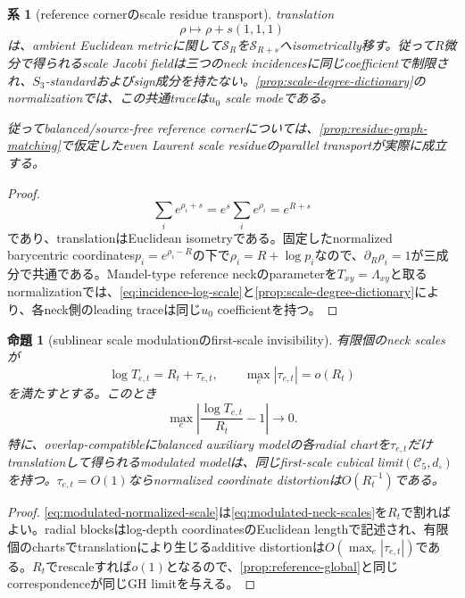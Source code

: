 \documentclass[11pt,a4paper]{ltjsarticle}
\newtheorem{proposition}[theorem]{命題}
\newtheorem{corollary}[theorem]{系}
\theoremstyle{definition}
\theoremstyle{remark}
\begin{document}
\begin{corollary}[reference cornerのscale residue transport]\label{cor:reference-corner-scale-transport}
translation
\begin{equation}\label{eq:softmax-diagonal-translation}
 \rho\longmapsto\rho+s(1,1,1)
\end{equation}
は、ambient Euclidean metricに関して$\mathscr S_R$を$\mathscr S_{R+s}$へisometrically移す。従って$R$微分で得られるscale Jacobi fieldは三つのneck incidencesに同じcoefficientで制限され、$S_3$-standardおよびsign成分を持たない。\cref{prop:scale-degree-dictionary}のnormalizationでは、この共通traceは$u_0$ scale modeである。

従ってbalanced/source-free reference cornerについては、\cref{prop:residue-graph-matching}で仮定したeven Laurent scale residueのparallel transportが実際に成立する。
\end{corollary}

\begin{proof}
\[
 \sum_ie^{\rho_i+s}=e^s\sum_ie^{\rho_i}=e^{R+s}
\]
であり、translationはEuclidean isometryである。固定したnormalized barycentric coordinates$p_i=e^{\rho_i-R}$の下で$\rho_i=R+\log p_i$なので、$\partial_R\rho_i=1$が三成分で共通である。Mandel-type reference neckのparameterを$T_{xy}=\Lambda_{xy}$と取るnormalizationでは、\eqref{eq:incidence-log-scale}と\cref{prop:scale-degree-dictionary}により、各neck側のleading traceは同じ$u_0$ coefficientを持つ。
\end{proof}

\begin{proposition}[sublinear scale modulationのfirst-scale invisibility]\label{prop:scale-modulation-invisible}
有限個のneck scalesが
\begin{equation}\label{eq:modulated-neck-scales}
 \log T_{e,t}=R_t+\tau_{e,t},
 \qquad
 \max_e|\tau_{e,t}|=o(R_t)
\end{equation}
を満たすとする。このとき
\begin{equation}\label{eq:modulated-normalized-scale}
 \max_e\left|\frac{\log T_{e,t}}{R_t}-1\right|\longrightarrow0.
\end{equation}
特に、overlap-compatibleにbalanced auxiliary modelの各radial chartを$\tau_{e,t}$だけtranslationして得られるmodulated modelは、同じfirst-scale cubical limit$(\mathcal C_5,d_\square)$を持つ。$\tau_{e,t}=O(1)$ならnormalized coordinate distortionは$O(R_t^{-1})$である。
\end{proposition}

\begin{proof}
\eqref{eq:modulated-normalized-scale}は\eqref{eq:modulated-neck-scales}を$R_t$で割ればよい。radial blocksはlog-depth coordinatesのEuclidean lengthで記述され、有限個のchartsでtranslationにより生じるadditive distortionは$O(\max_e|\tau_{e,t}|)$である。$R_t$でrescaleすれば$o(1)$となるので、\cref{prop:reference-global}と同じcorrespondenceが同じGH limitを与える。
\end{proof}
\end{document}
